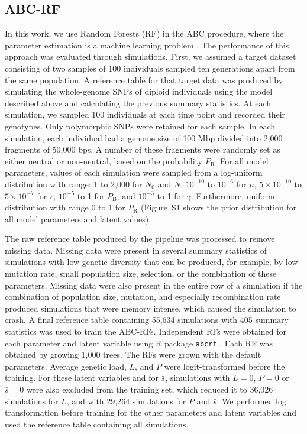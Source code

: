 \documentclass[a4paper, 12pt]{article}
\begin{document}
\subsection*{ABC-RF}

In this work, we use Random Forests (RF) in the ABC procedure, where the parameter estimation is a machine learning problem \citep{Pudlo:2016il, Raynal:2019jj}. The performance of this approach was evaluated through simulations. First, we assumed a target dataset consisting of two samples of 100 individuals sampled ten generations apart from the same population. A reference table for that target data was produced by simulating the whole-genome SNPs of diploid individuals using the model described above and calculating the previous summary statistics. At each simulation, we sampled 100 individuals at each time point and recorded their genotypes. Only polymorphic SNPs were retained for each sample. In each simulation, each individual had a genome size of 100 Mbp divided into 2,000 fragments of 50,000 bps. A number of these fragments were randomly set as either neutral or non-neutral, based on the probability $P_{\mathrm{R}}$. For all model parameters, values of each simulation were sampled from a log-uniform distribution with range: 1 to 2,000 for $N_\mathrm{0}$ and $N$, $10^{-10}$ to $10^{-6}$ for $\mu$, $5\times 10^{-10}$ to $5\times 10^{-7}$ for $r$, $10^{-5}$ to 1 for $P_{\mathrm{B}}$, and $10^{-3}$ to 1 for $\gamma$. Furthermore, uniform distribution with range 0 to 1 for $P_{\mathrm{R}}$ (Figure~S1 shows the prior distribution for all model parameters and latent values).

The raw reference table produced by the pipeline was processed to remove missing data. Missing data were present in several summary statistics of simulations with low genetic diversity that can be produced, for example, by low mutation rate, small population size, selection, or the combination of these parameters. Missing data were also present in the entire row of a simulation if the combination of population size, mutation, and especially recombination rate produced simulations that were memory intense, which caused the simulation to crash. A final reference table containing 55,634 simulations with 405 summary statistics was used to train the ABC-RFs. Independent RFs were obtained for each parameter and latent variable using R package \texttt{abcrf} \citep{Pudlo:2016il, Raynal:2019jj}. Each RF was obtained by growing 1,000 trees. The RFs were grown with the default parameters. Average genetic load, $L$, and $P$ were logit-transformed before the training. For these latent variables and for $\bar{s}$, simulations with $L=0$, $P=0$ or $\bar{s} = 0$ were also excluded from the training set, which reduced it to 36,026 simulations for $L$, and with 29,264 simulations for $P$ and $\bar{s}$. We performed log transformation before training for the other parameters and latent variables and used the reference table containing all simulations.
\end{document}
